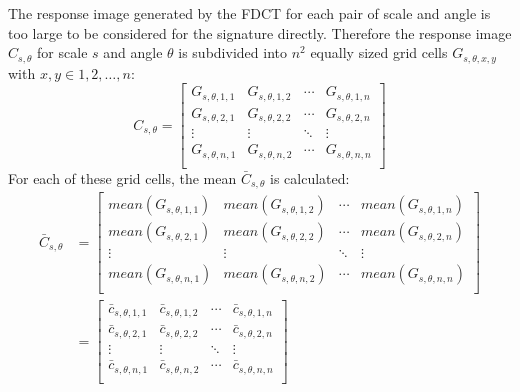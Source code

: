 The response image generated by the FDCT for each pair of scale and angle is
too large to be considered for the signature directly. Therefore the response
image $C_{s, \theta}$ for scale $s$ and angle $\theta$ is subdivided into $n^2$
equally sized grid cells $G_{s, \theta, x, y}$ with $x, y \in 1, 2, \dots, n$:
\begin{equation*}
    C_{s,\theta} =
    \begin{bmatrix}
        G_{s,\theta,1,1} & G_{s,\theta,1,2} & \cdots & G_{s,\theta,1,n} \\
        G_{s,\theta,2,1} & G_{s,\theta,2,2} & \cdots & G_{s,\theta,2,n} \\
        \vdots  & \vdots  & \ddots & \vdots  \\
        G_{s,\theta,n,1} & G_{s,\theta,n,2} & \cdots & G_{s,\theta,n,n} \\
    \end{bmatrix}
\end{equation*}
For each of these grid cells, the mean $\bar{C}_{s, \theta}$ is calculated:
\begin{align*}
    \bar{C}_{s,\theta} &=
    \begin{bmatrix}
        mean(G_{s,\theta,1,1}) & mean(G_{s,\theta,1,2}) & \cdots & mean(G_{s,\theta,1,n}) \\
        mean(G_{s,\theta,2,1}) & mean(G_{s,\theta,2,2}) & \cdots & mean(G_{s,\theta,2,n}) \\
        \vdots  & \vdots  & \ddots & \vdots  \\
        mean(G_{s,\theta,n,1}) & mean(G_{s,\theta,n,2}) & \cdots & mean(G_{s,\theta,n,n}) \\
    \end{bmatrix} \\
    &=
    \begin{bmatrix}
        \bar{c}_{s,\theta,1,1} & \bar{c}_{s,\theta,1,2} & \cdots & \bar{c}_{s,\theta,1,n} \\
        \bar{c}_{s,\theta,2,1} & \bar{c}_{s,\theta,2,2} & \cdots & \bar{c}_{s,\theta,2,n} \\
        \vdots  & \vdots  & \ddots & \vdots  \\
        \bar{c}_{s,\theta,n,1} & \bar{c}_{s,\theta,n,2} & \cdots & \bar{c}_{s,\theta,n,n} \\
    \end{bmatrix}
\end{align*}

